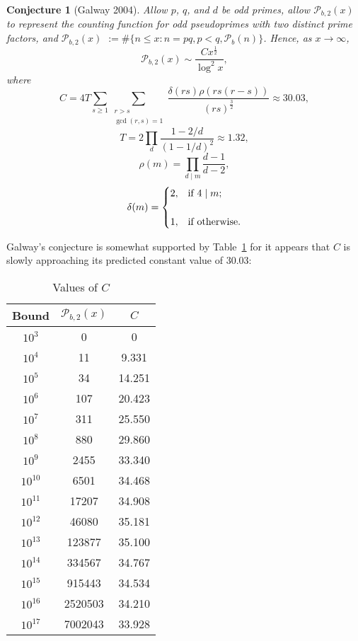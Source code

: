 \documentclass[11pt]{article}
\theoremstyle{plain}
\newtheorem{conj}[subsubsection]{Conjecture}
\theoremstyle{definition}
\theoremstyle{remark}
\numberwithin{equation}{subsection}
\begin{document}
\begin{conj}[Galway 2004] \label{pseudo4}
Allow $p$, $q$, and $d$ be odd primes, allow ${\mathscr{P}_{b,2}}(x)$ to represent the counting function for odd pseudoprimes with two distinct prime factors, and ${\mathscr{P}_{b,2}}(x)$ $:= \#\{n \le x: n=pq, p<q, \mathscr{P}_b(n)\}$. Hence, as $x\to\infty$,
\begin{equation} \label{7}
\mathscr{P}_{b,2}(x) \sim \frac{C{x^{\frac{1}{2}}}}{\log^2 x},
\end{equation}
where
\begin{equation} \label{8}
C = 	4T{\sum_{s \ge 1}}
			\sum_{\substack{r > s \\ \gcd(r,s)=1}}
			\frac{\delta(rs)\rho(rs(r-s)) }{ (rs)^{\frac{3}{2} }} \approx 30.03,
\end{equation}
\begin{equation} \label{9}
T = 2{\prod_d}{\frac{1-2/d}{(1-1/d)^{2}}} \approx 1.32,
\end{equation}
\begin{equation} \label{10}
\rho(m) = {\prod_{d \mid m}}{\frac{d-1}{d-2}},
\end{equation}
\begin{equation} \label{11}
\delta(m) = \begin{cases}  2, & $if {$4\mid m$}$; \\
\\
1, & $if otherwise.$
\end{cases}
\end{equation}
\end{conj}
Galway's conjecture is somewhat supported by Table~\ref{table4} for it appears that $C$ is slowly approaching its predicted constant value of $30.03$:
\begin{table}[ht]
\caption{Values of $C$}
\centering
\begin{tabular}{ || c | c | c || }
    \hline
\textbf{Bound} & \textbf{$\mathscr{P}_{b,2}(x)$} & \textbf{$C$}\\ \hline
$10^{3}$ & 0 & 0\\
$10^{4}$ & 11 & 9.331\\
$10^{5}$ & 34 & 14.251\\
$10^{6}$ & 107 & 20.423\\
$10^{7}$ & 311 & 25.550\\
$10^{8}$ & 880 & 29.860\\
$10^{9}$ & 2455 & 33.340\\
$10^{10}$ & 6501 & 34.468\\
$10^{11}$ & 17207 & 34.908\\
$10^{12}$ & 46080 & 35.181\\
$10^{13}$ & 123877 & 35.100\\
$10^{14}$ & 334567 & 34.767\\
$10^{15}$ & 915443 & 34.534\\

$10^{16}$ & 2520503 & 34.210\\

$10^{17}$ & 7002043 & 33.928\\ \hline
\end{tabular}
\label{table4}
\end{table}
\end{document}

